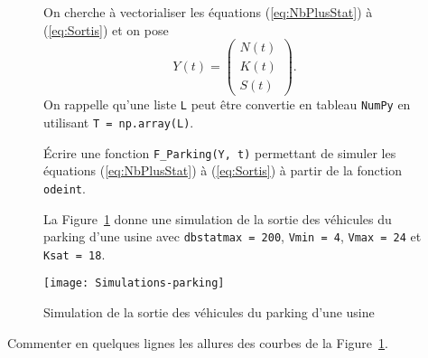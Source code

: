 \noindent
\begin{figure}[!htb]
\begin{minipage}{0.48\textwidth}

On cherche à vectorialiser les équations (\ref{eq:NbPlusStat}) à (\ref{eq:Sortis}) et on pose \[Y(t)=\begin{pmatrix}N(t)\\ K(t)\\ S(t)\end{pmatrix}.\]
On rappelle qu'une liste \texttt{L} peut être convertie en tableau \texttt{NumPy} en utilisant
\texttt{T = np.array(L)}.

\question{} \' Ecrire une fonction \texttt{F\_Parking(Y, t)} permettant de simuler les équations  (\ref{eq:NbPlusStat}) à (\ref{eq:Sortis}) à partir de la fonction \texttt{odeint}.

La Figure~\ref{f_parking} donne une simulation de la sortie des véhicules du parking d'une usine avec\linebreak
 \texttt{dbstatmax = 200}, \texttt{Vmin = 4}, \texttt{Vmax = 24} et \texttt{Ksat = 18}.
\end{minipage}\hfill
\begin{minipage}{0.48\textwidth}
\begin{center}
\texttt{[image: Simulations-parking]}
\caption{\label{f_parking} Simulation de la sortie des véhicules du parking d'une usine}
\end{center}
\end{minipage}
\end{figure}


\question{} Commenter en quelques lignes les allures des courbes de la Figure~\ref{f_parking}.
